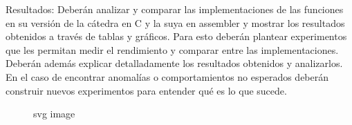 Resultados: Deberán analizar y comparar las implementaciones de las funciones en su versión de la cátedra en C y la suya en assembler y mostrar los resultados obtenidos a través de tablas y gráficos. Para esto deberán plantear experimentos que les permitan medir el rendimiento y comparar entre las implementaciones. Deberán además explicar detalladamente los resultados obtenidos y analizarlos. En el caso de encontrar anomalías o comportamientos no esperados deberán construir nuevos experimentos para entender qué es lo que sucede.
\begin{figure}[htbp]
  \centering
  
  \caption{svg image}
\end{figure}